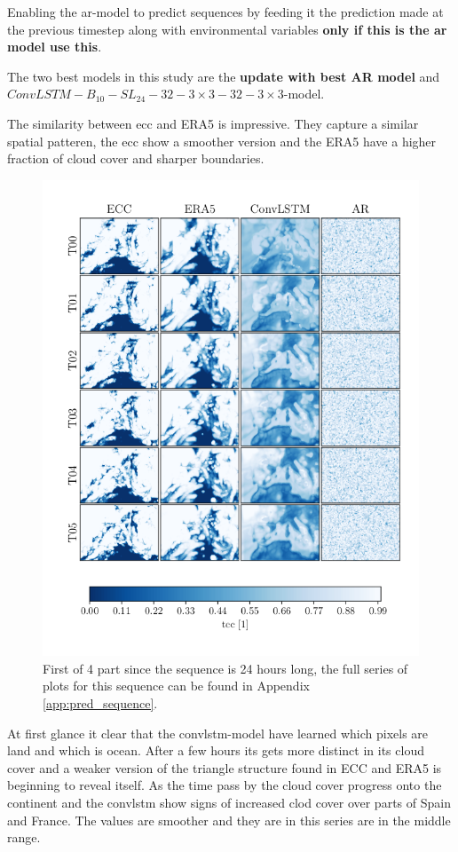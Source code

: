Enabling the \acrshort{ar}-model to predict sequences by feeding it the prediction made at the previous timestep along with environmental variables \textbf{only if this is the ar model use this}.

The two best models in this study are the \textbf{update with best AR model} and $ConvLSTM-B_{10}-SL_{24}-32-3\times3-32-3 \times3$-model.

The similarity between \acrshort{ecc} and ERA5 is impressive. They capture a similar spatial patteren, the ecc show a smoother version and the ERA5 have a higher fraction of cloud cover and sharper boundaries. 
\begin{figure}[ht]
    \centering
    \includegraphics[sale=0.1]{python_figs/comparting_seq_part_1_of4.png}
    \caption{First of 4 part since the sequence is 24 hours long, the full series of plots for this sequence can be found in Appendix \ref{app:pred_sequence}.}
    \label{fig:target_predict_era5_horizontal}
\end{figure}
At first glance it clear that the \acrshort{convlstm}-model have learned which pixels are land and which is ocean. After a few hours its gets more distinct in its cloud cover and a weaker version of the triangle structure found in ECC and ERA5 is beginning to reveal itself. As the time pass by the cloud cover progress onto the continent and the \acrshort{convlstm} show signs of increased clod cover over parts of Spain and France.
The values are smoother and they are in this series are in the middle range.

